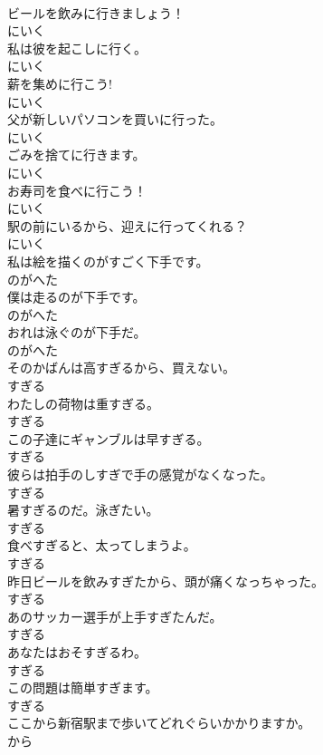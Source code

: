 \documentclass[8pt]{extreport}
\begin{document}
\begin{CJK}{UTF8}{min}
\\	ビールを飲みに行きましょう！	
\\	にいく	
\\	私は彼を起こしに行く。	
\\	にいく	
\\	薪を集めに行こう!	
\\	にいく	
\\	父が新しいパソコンを買いに行った。	
\\	にいく	
\\	ごみを捨てに行きます。	
\\	にいく	
\\	お寿司を食べに行こう！	
\\	にいく	
\\	駅の前にいるから、迎えに行ってくれる？	
\\	にいく	
\\	私は絵を描くのがすごく下手です。	
\\	のがへた	
\\	僕は走るのが下手です。	
\\	のがへた	
\\	おれは泳ぐのが下手だ。	
\\	のがへた	
\\	そのかばんは高すぎるから、買えない。	
\\	すぎる	
\\	わたしの荷物は重すぎる。	
\\	すぎる	
\\	この子達にギャンブルは早すぎる。	
\\	すぎる	
\\	彼らは拍手のしすぎで手の感覚がなくなった。	
\\	すぎる	
\\	暑すぎるのだ。泳ぎたい。	
\\	すぎる	
\\	食べすぎると、太ってしまうよ。	
\\	すぎる	
\\	昨日ビールを飲みすぎたから、頭が痛くなっちゃった。	
\\	すぎる	
\\	あのサッカー選手が上手すぎたんだ。	
\\	すぎる	
\\	あなたはおそすぎるわ。	
\\	すぎる	
\\	この問題は簡単すぎます。	
\\	すぎる	
\\	ここから新宿駅まで歩いてどれぐらいかかりますか。	
\\	から	

\end{CJK}
\end{document}
